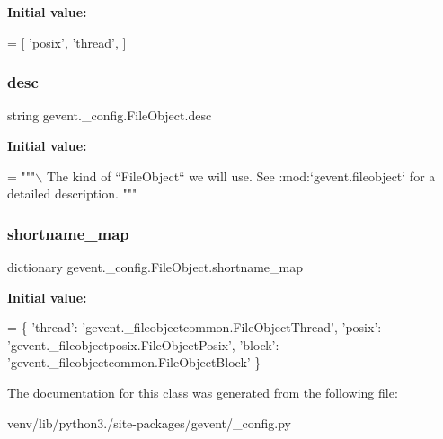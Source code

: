 {\bfseries Initial value\+:}
\begin{DoxyCode}
=  [
        \textcolor{stringliteral}{'posix'},
        \textcolor{stringliteral}{'thread'},
    ]
\end{DoxyCode}
\mbox{\label{classgevent_1_1__config_1_1_file_object_aeb0f272fe17ac9387346098d3a67941e}} 
\subsubsection{\texorpdfstring{desc}{desc}}
{\footnotesize\ttfamily string gevent.\+\_\+config.\+File\+Object.\+desc\hspace{0.3cm}{\ttfamily [static]}}

{\bfseries Initial value\+:}
\begin{DoxyCode}
=  \textcolor{stringliteral}{"""\(\backslash\)}
\textcolor{stringliteral}{The kind of ``FileObject`` we will use.}
\textcolor{stringliteral}{}
\textcolor{stringliteral}{See :mod:`gevent.fileobject` for a detailed description.}
\textcolor{stringliteral}{}
\textcolor{stringliteral}{"""}
\end{DoxyCode}
\mbox{\label{classgevent_1_1__config_1_1_file_object_a1ed8b4ac0ba90309998541a15d54d0ed}} 
\subsubsection{\texorpdfstring{shortname\+\_\+map}{shortname\_map}}
{\footnotesize\ttfamily dictionary gevent.\+\_\+config.\+File\+Object.\+shortname\+\_\+map\hspace{0.3cm}{\ttfamily [static]}}

{\bfseries Initial value\+:}
\begin{DoxyCode}
=  \{
        \textcolor{stringliteral}{'thread'}: \textcolor{stringliteral}{'gevent.\_fileobjectcommon.FileObjectThread'},
        \textcolor{stringliteral}{'posix'}: \textcolor{stringliteral}{'gevent.\_fileobjectposix.FileObjectPosix'},
        \textcolor{stringliteral}{'block'}: \textcolor{stringliteral}{'gevent.\_fileobjectcommon.FileObjectBlock'}
    \}
\end{DoxyCode}


The documentation for this class was generated from the following file\+:\begin{DoxyCompactItemize}
\item 
venv/lib/python3./site-\/packages/gevent/\+\_\+config.\+py\end{DoxyCompactItemize}
